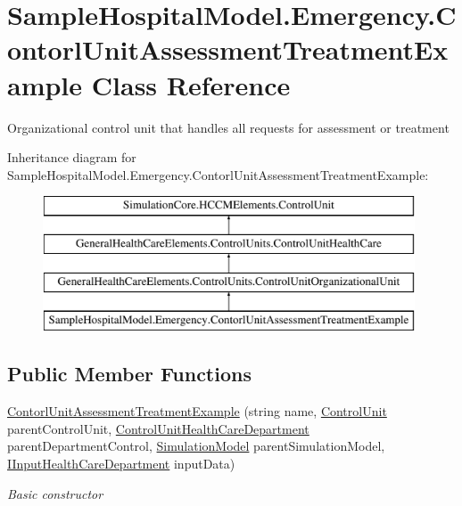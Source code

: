 \hypertarget{class_sample_hospital_model_1_1_emergency_1_1_contorl_unit_assessment_treatment_example}{}\section{Sample\+Hospital\+Model.\+Emergency.\+Contorl\+Unit\+Assessment\+Treatment\+Example Class Reference}
\label{class_sample_hospital_model_1_1_emergency_1_1_contorl_unit_assessment_treatment_example}


Organizational control unit that handles all requests for assessment or treatment  


Inheritance diagram for Sample\+Hospital\+Model.\+Emergency.\+Contorl\+Unit\+Assessment\+Treatment\+Example\+:\begin{figure}[H]
\begin{center}
\leavevmode
\includegraphics[height=4.000000cm]{class_sample_hospital_model_1_1_emergency_1_1_contorl_unit_assessment_treatment_example}
\end{center}
\end{figure}
\subsection*{Public Member Functions}
\begin{DoxyCompactItemize}
\item 
\hyperlink{class_sample_hospital_model_1_1_emergency_1_1_contorl_unit_assessment_treatment_example_a209b25555c7c1f00212137dbb213577b}{Contorl\+Unit\+Assessment\+Treatment\+Example} (string name, \hyperlink{class_simulation_core_1_1_h_c_c_m_elements_1_1_control_unit}{Control\+Unit} parent\+Control\+Unit, \hyperlink{class_general_health_care_elements_1_1_control_units_1_1_control_unit_health_care_department}{Control\+Unit\+Health\+Care\+Department} parent\+Department\+Control, \hyperlink{class_simulation_core_1_1_simulation_classes_1_1_simulation_model}{Simulation\+Model} parent\+Simulation\+Model, \hyperlink{interface_general_health_care_elements_1_1_input_1_1_i_input_health_care_department}{I\+Input\+Health\+Care\+Department} input\+Data)
\begin{DoxyCompactList}\small\item\em Basic constructor \end{DoxyCompactList}\end{DoxyCompactItemize}
